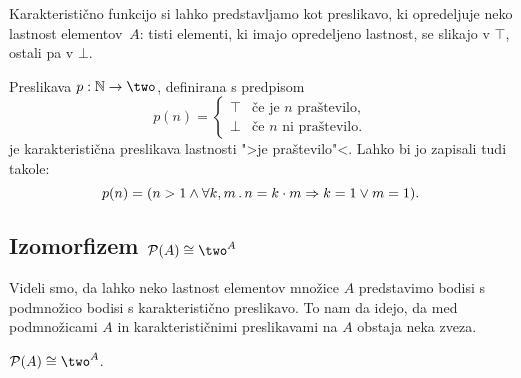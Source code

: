Karakteristično funkcijo si lahko predstavljamo kot preslikavo, ki opredeljuje
neko lastnost elementov~$A$: tisti elementi, ki imajo opredeljeno lastnost, se
slikajo v $\top$, ostali pa v $\bot$.

\begin{primer}
  Preslikava $p : \NN \to \two$, definirana s predpisom
  \begin{equation*}
    p(n) = 
    \begin{cases}
      \top & \text{če je $n$ praštevilo}, \\
      \bot & \text{če $n$ ni praštevilo}.
    \end{cases}
  \end{equation*}
  je karakteristična preslikava lastnosti ">je praštevilo"<. Lahko bi jo zapisali tudi takole:
  \begin{equation*}
    p(n) = (n > 1 \land \forall k, m \,.\, n = k \cdot m \Rightarrow k = 1 \lor m = 1).
  \end{equation*}
\end{primer}


\subsection{Izomorfizem $\pow{A} \cong \two^A$}

Videli smo, da lahko neko lastnost elementov množice $A$ predstavimo bodisi s
podmnožico bodisi s karakteristično preslikavo. To nam da idejo, da med
podmnožicami $A$ in karakterističnimi preslikavami na $A$ obstaja neka zveza.

\begin{izrek}
  $\pow{A} \cong \two^A$.
\end{izrek}

